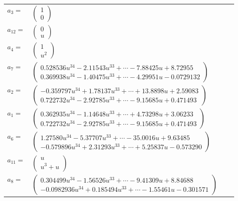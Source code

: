 \documentclass[1p]{elsarticle_modified}
\theoremstyle{definition}
\begin{document}
\begin{tabular}{m{7pt} m{180pt} m{7pt} m{180pt} }
\flushright $a_{3}=$&$\begin{pmatrix}1\\0\end{pmatrix}$ \\
\flushright $a_{12}=$&$\begin{pmatrix}0\\u\end{pmatrix}$ \\
\flushright $a_{4}=$&$\begin{pmatrix}1\\u^2\end{pmatrix}$ \\
\flushright $a_{7}=$&$\begin{pmatrix}0.528536 u^{34}-2.11543 u^{33}+\cdots-7.88425 u+8.72955\\0.369938 u^{34}-1.40475 u^{33}+\cdots-4.29951 u-0.0729132\end{pmatrix}$ \\
\flushright $a_{2}=$&$\begin{pmatrix}-0.359797 u^{34}+1.78137 u^{33}+\cdots+13.8898 u+2.59083\\0.722732 u^{34}-2.92785 u^{33}+\cdots-9.15685 u+0.471493\end{pmatrix}$ \\
\flushright $a_{1}=$&$\begin{pmatrix}0.362935 u^{34}-1.14648 u^{33}+\cdots+4.73298 u+3.06233\\0.722732 u^{34}-2.92785 u^{33}+\cdots-9.15685 u+0.471493\end{pmatrix}$ \\
\flushright $a_{6}=$&$\begin{pmatrix}1.27580 u^{34}-5.37707 u^{33}+\cdots-35.0016 u+9.63485\\-0.579896 u^{34}+2.31293 u^{33}+\cdots+5.25837 u-0.573290\end{pmatrix}$ \\
\flushright $a_{11}=$&$\begin{pmatrix}u\\u^3+u\end{pmatrix}$ \\
\flushright $a_{8}=$&$\begin{pmatrix}0.304499 u^{34}-1.56526 u^{33}+\cdots-9.41309 u+8.84688\\-0.0982936 u^{34}+0.185494 u^{33}+\cdots-1.55461 u-0.301571\end{pmatrix}$ \\

\end{tabular}
\end{document}
